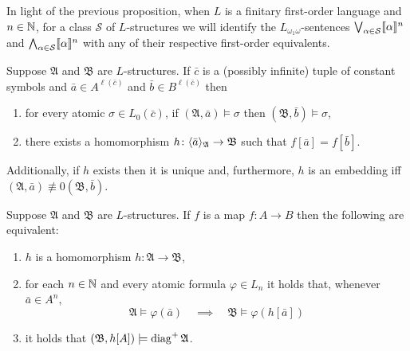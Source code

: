 In light of the previous proposition, when $L$ is a finitary first-order language and $n\in\mathbb{N}$, for a class $\mathcal{S}$ of $L$-structures we will identify the $L_{\omega_1\omega}$-sentences $\bigvee_{\alpha\in\mathcal{S}}\llbracket\alpha\rrbracket^{n}$ and $\bigwedge_{\alpha\in\mathcal{S}}\llbracket\alpha\rrbracket^{n}$ with any of their respective first-order equivalents.

\begin{lem}\label{lem:diagH}
	Suppose $\mathfrak{A}$ and $\mathfrak{B}$ are $L$-structures.  If $\bar{c}$ is a (possibly infinite) tuple of constant symbols and $\bar{a}\in A^{\ell(\bar{c})}$ and $\bar{b}\in B^{\ell(\bar{c})}$ then
	\begin{enumerate}
		\item 	for every atomic $\sigma\in L_0(\bar{c})$, if $(\mathfrak{A},\bar{a})\models\sigma$ then $(\mathfrak{B},\bar{b})\models\sigma$,
		\item  there exists a homomorphism $h\colon\langle \bar{a}\rangle_{\mathfrak{A}}\to\mathfrak{B}$ such that $f[\bar{a}]=f[\bar{b}]$.
	\end{enumerate}
	Additionally, if $h$ exists then it is unique and, furthermore, $h$ is an embedding iff $(\mathfrak{A},\bar{a})\nequiv{0}(\mathfrak{B},\bar{b})$.
\end{lem}

\begin{lem}\label{lem:diagp}
	Suppose $\mathfrak{A}$ and $\mathfrak{B}$ are $L$-structures.  If $f$ is a map $f\colon A\to B$ then the following are equivalent:
	\begin{enumerate}
		\item	$h$ is a homomorphism $h\colon\mathfrak{A}\to\mathfrak{B}$,
		\item	for each $n\in\mathbb{N}$ and every atomic formula $\varphi\in L_n$ it holds that, whenever $\bar{a}\in A^n$,
		      \begin{equation}
			      \mathfrak{A}\models\varphi(\bar{a}) \quad\implies\quad \mathfrak{B}\models\varphi(h[\bar{a}])
		      \end{equation}
		\item	it holds that $(\mathfrak{B},h[A])\models\operatorname{{diag}^{+}}\mathfrak{A}$.
	\end{enumerate}
\end{lem}

